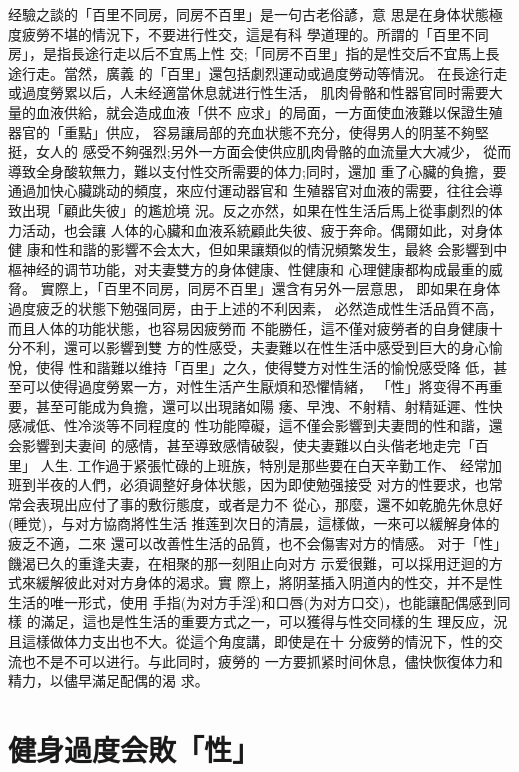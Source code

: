 \documentclass[12pt,UTF8]{ctexbook}
\begin{document}
经驗之談的「百里不同房，同房不百里」是一句古老俗諺，意
思是在身体状態極度疲勞不堪的情況下，不要进行性交，這是有科
學道理的。所謂的「百里不同房」，是指長途行走以后不宜馬上性
交;「同房不百里」指的是性交后不宜馬上長途行走。當然，廣義
的「百里」還包括劇烈運动或過度勞动等情況。
在長途行走或過度勞累以后，人未经適當休息就进行性生活，
肌肉骨骼和性器官同时需要大量的血液供給，就会造成血液「供不
应求」的局面，一方面使血液難以保證生殖器官的「重點」供应，
容易讓局部的充血状態不充分，使得男人的阴茎不夠堅挺，女人的
感受不夠强烈;另外一方面会使供应肌肉骨骼的血流量大大减少，
從而導致全身酸软無力，難以支付性交所需要的体力;同时，還加
重了心臟的負擔，要通過加快心臟跳动的頻度，來应付運动器官和
生殖器官对血液的需要，往往会導致出現「顧此失彼」的尷尬境
況。反之亦然，如果在性生活后馬上從事劇烈的体力活动，也会讓
人体的心臟和血液系統顧此失彼、疲于奔命。偶爾如此，对身体健
康和性和諧的影響不会太大，但如果讓類似的情況頻繁发生，最終
会影響到中樞神经的调节功能，对夫妻雙方的身体健康、性健康和
心理健康都构成最重的威脅。
實際上，「百里不同房，同房不百里」還含有另外一层意思，
即如果在身体過度疲乏的状態下勉强同房，由于上述的不利因素，
必然造成性生活品質不高，而且人体的功能状態，也容易因疲勞而
不能勝任，這不僅对疲勞者的自身健康十分不利，還可以影響到雙
方的性感受，夫妻難以在性生活中感受到巨大的身心愉悅，使得
性和諧難以维持「百里」之久，使得雙方对性生活的愉悅感受降
低，甚至可以使得過度勞累一方，对性生活产生厭煩和恐懼情緒，
「性」將变得不再重要，甚至可能成为負擔，還可以出現諸如陽
痿、早洩、不射精、射精延遲、性快感减低、性冷淡等不同程度的
性功能障礙，這不僅会影響到夫妻問的性和諧，還会影響到夫妻间
的感情，甚至導致感情破裂，使夫妻難以白头偕老地走完「百里」
人生.
工作過于紧張忙碌的上班族，特別是那些要在白天辛勤工作、
经常加班到半夜的人們，必須调整好身体状態，因为即使勉强接受
对方的性要求，也常常会表現出应付了事的敷衍態度，或者是力不
從心，那麼，還不如乾脆先休息好(睡觉)，与对方協商將性生活
推莲到次日的清晨，這樣做，一來可以緩解身体的疲乏不適，二來
還可以改善性生活的品質，也不会傷害对方的情感。
对于「性」饑渴已久的重逢夫妻，在相聚的那一刻阻止向对方
示爱很難，可以採用迂迴的方式來緩解彼此对对方身体的渴求。實
際上，將阴茎插入阴道内的性交，并不是性生活的唯一形式，使用
手指(为对方手淫)和口唇(为对方口交)，也能讓配偶感到同樣
的滿足，這也是性生活的重要方式之一，可以獲得与性交同樣的生
理反应，況且這樣做体力支出也不大。從這个角度講，即使是在十
分疲勞的情況下，性的交流也不是不可以进行。与此同时，疲勞的
一方要抓紧时间休息，儘快恢復体力和精力，以儘早滿足配偶的渴
求。

\section{健身過度会敗「性」}
\end{document}
